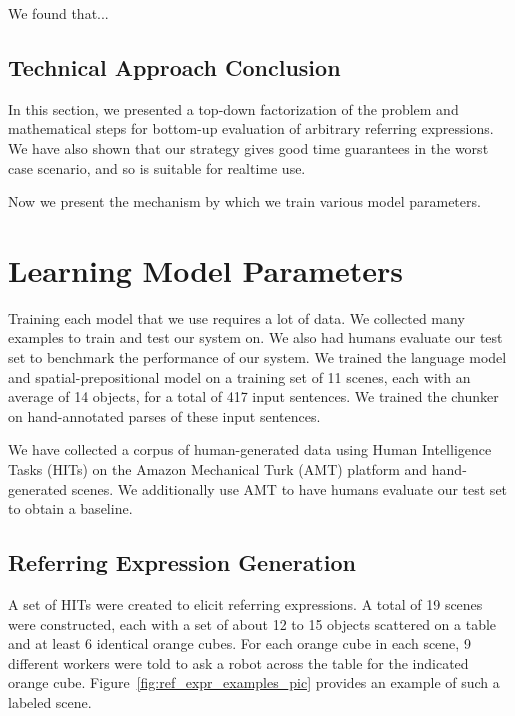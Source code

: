 \documentclass[conference]{IEEEtran}
\numberwithin{equation}{section}
\begin{document}
We found that...


\subsection{Technical Approach Conclusion}

In this section, we presented a top-down factorization of the problem and mathematical steps for bottom-up evaluation of arbitrary referring expressions. We have also shown that our strategy gives good time guarantees in the worst case scenario, and so is suitable for realtime use.

Now we present the mechanism by which we train various model parameters.

\section{Learning Model Parameters} 

Training each model that we use requires a lot of data. We collected many examples to train and test our system on. We also had humans evaluate our test set to benchmark the performance of our system. We trained the language model and spatial-prepositional model on a training set of 11 scenes, each with an average of 14 objects, for a total of 417 input sentences. We trained the chunker on hand-annotated parses of these input sentences.

We have collected a corpus of human-generated data using Human Intelligence Tasks (HITs) on the Amazon Mechanical Turk (AMT) platform and hand-generated scenes. We additionally use AMT to have humans evaluate our test set to obtain a baseline.

 \subsection{Referring Expression Generation}
A set of HITs were created to elicit referring expressions. A total of 19 scenes were constructed, each with a set of about 12 to 15 objects scattered on a table and at least 6 identical orange cubes. For each orange cube in each scene, 9 different workers were told to ask a robot across the table for the indicated orange cube. Figure~\ref{fig:ref_expr_examples_pic} provides an example of such a labeled scene.
\end{document}
